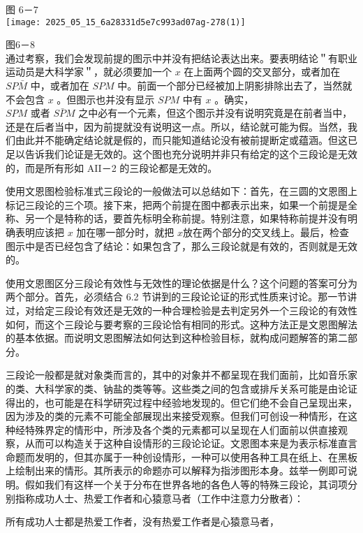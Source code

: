 图 6－7\\
\texttt{[image: 2025\_05\_15\_6a28331d5e7c993ad07ag-278(1)]}

图6－8\\
通过考察，我们会发现前提的图示中并没有把结论表达出来。要表明结论＂有职业运动员是大科学家＂，就必须要加一个 $x$ 在上面两个圆的交叉部分，或者加在 $S P \bar{M}$ 中，或者加在 $S P M$ 中。前面一个部分已经被加上阴影排除出去了，当然就不会包含 $x$ 。但图示也并没有显示 $S P M$ 中有 $x$ 。确实，\\
$S P M$ 或者 $S \bar{P} M$ 之中必有一个元素，但这个图示并没有说明究竟是在前者当中，还是在后者当中，因为前提就没有说明这一点。所以，结论就可能为假。当然，我们由此并不能确定结论就是假的，而只能知道结论没有被前提断定或蕴涵。但这已足以告诉我们论证是无效的。这个图也充分说明并非只有给定的这个三段论是无效的，而是所有形如 AII－2 的三段论都是无效的。

使用文恩图检验标准式三段论的一般做法可以总结如下：首先，在三圆的文恩图上标记三段论的三个项。接下来，把两个前提在图中都表示出来，如果一个前提是全称、另一个是特称的话，要首先标明全称前提。特别注意，如果特称前提并没有明确表明应该把 $x$ 加在哪一部分时，就把 $x$放在两个部分的交叉线上。最后，检查图示中是否已经包含了结论：如果包含了，那么三段论就是有效的，否则就是无效的。

使用文恩图区分三段论有效性与无效性的理论依据是什么？这个问题的答案可分为两个部分。首先，必须结合 6.2 节讲到的三段论论证的形式性质来讨论。那一节讲过，对给定三段论有效还是无效的一种合理检验是去判定另外一个三段论的有效性如何，而这个三段论与要考察的三段论恰有相同的形式。这种方法正是文恩图解法的基本依据。而说明文恩图解法如何达到这种检验目标，就构成问题解答的第二部分。

三段论一般都是就对象类而言的，其中的对象并不都呈现在我们面前，比如音乐家的类、大科学家的类、钠盐的类等等。这些类之间的包含或排斥关系可能是由论证得出的，也可能是在科学研究过程中经验地发现的。但它们绝不会自己呈现出来，因为涉及的类的元素不可能全部展现出来接受观察。但我们可创设一种情形，在这种经特殊界定的情形中，所涉及各个类的元素都可以呈现在人们面前以供直接观察，从而可以构造关于这种自设情形的三段论论证。文恩图本来是为表示标准直言命题而发明的，但其亦属于一种创设情形，一种可以使用各种工具在纸上、在黑板上绘制出来的情形。其所表示的命题亦可以解释为指涉图形本身。兹举一例即可说明。假如我们有这样一个关于分布在世界各地的各色人等的特殊三段论，其词项分别指称成功人士、热爱工作者和心猿意马者（工作中注意力分散者）：

所有成功人士都是热爱工作者，没有热爱工作者是心猿意马者，

